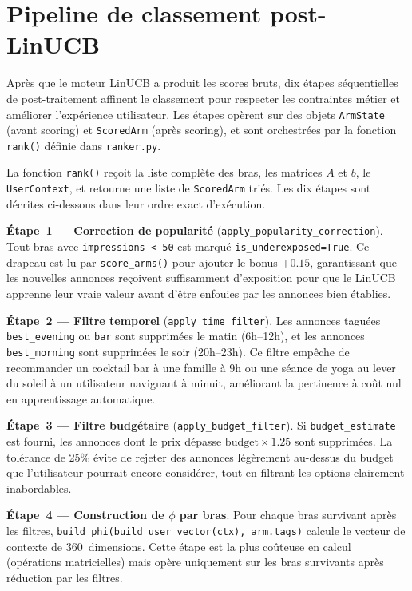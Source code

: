 \section{Pipeline de classement post-LinUCB}

Après que le moteur LinUCB a produit les scores bruts, dix étapes séquentielles de
post-traitement affinent le classement pour respecter les contraintes métier et améliorer
l'expérience utilisateur. Les étapes opèrent sur des objets \texttt{ArmState} (avant scoring)
et \texttt{ScoredArm} (après scoring), et sont orchestrées par la fonction \texttt{rank()}
définie dans \texttt{ranker.py}.

La fonction \texttt{rank()} reçoit la liste complète des bras, les matrices $A$ et $b$,
le \texttt{UserContext}, et retourne une liste de \texttt{ScoredArm} triés. Les dix étapes
sont décrites ci-dessous dans leur ordre exact d'exécution.

\textbf{Étape~1 --- Correction de popularité} (\texttt{apply\_popularity\_correction}).
Tout bras avec \texttt{impressions < 50} est marqué \texttt{is\_underexposed=True}. Ce
drapeau est lu par \texttt{score\_arms()} pour ajouter le bonus $+0.15$, garantissant que les
nouvelles annonces reçoivent suffisamment d'exposition pour que le LinUCB apprenne leur vraie
valeur avant d'être enfouies par les annonces bien établies.

\textbf{Étape~2 --- Filtre temporel} (\texttt{apply\_time\_filter}). Les annonces taguées
\texttt{best\_evening} ou \texttt{bar} sont supprimées le matin (6h--12h), et les annonces
\texttt{best\_morning} sont supprimées le soir (20h--23h). Ce filtre empêche de recommander
un cocktail bar à une famille à 9h ou une séance de yoga au lever du soleil à un utilisateur
naviguant à minuit, améliorant la pertinence à coût nul en apprentissage automatique.

\textbf{Étape~3 --- Filtre budgétaire} (\texttt{apply\_budget\_filter}). Si
\texttt{budget\_estimate} est fourni, les annonces dont le prix dépasse
$\text{budget} \times 1.25$ sont supprimées. La tolérance de 25\% évite de rejeter des
annonces légèrement au-dessus du budget que l'utilisateur pourrait encore considérer, tout
en filtrant les options clairement inabordables.

\textbf{Étape~4 --- Construction de $\phi$ par bras}. Pour chaque bras survivant après les
filtres, \texttt{build\_phi(build\_user\_vector(ctx), arm.tags)} calcule le vecteur de
contexte de 360~dimensions. Cette étape est la plus coûteuse en calcul (opérations
matricielles) mais opère uniquement sur les bras survivants après réduction par les filtres.

